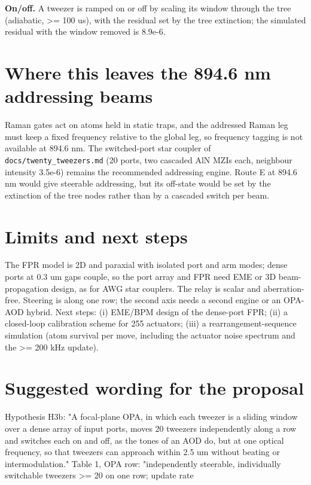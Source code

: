 \textbf{On/off.} A tweezer is ramped on or off by scaling its window
through the tree (adiabatic, \textgreater= 100 us), with the residual
set by the tree extinction; the simulated residual with the window
removed is 8.9e-6.

\hypertarget{5-where-this-leaves-the-8946-nm-addressing-beams}{%
\section{Where this leaves the 894.6 nm addressing
beams}\label{independent_steering-5-where-this-leaves-the-8946-nm-addressing-beams}}

Raman gates act on atoms held in static traps, and the addressed Raman
leg must keep a fixed frequency relative to the global leg, so frequency
tagging is not available at 894.6 nm. The switched-port star coupler of
\texttt{docs/twenty\_tweezers.md} (20 ports, two cascaded AlN MZIs each,
neighbour intensity 3.5e-6) remains the recommended addressing engine.
Route E at 894.6 nm would give steerable addressing, but its off-state
would be set by the extinction of the tree nodes rather than by a
cascaded switch per beam.

\hypertarget{6-limits-and-next-steps}{%
\section{Limits and next steps}\label{independent_steering-6-limits-and-next-steps}}

The FPR model is 2D and paraxial with isolated port and arm modes; dense
ports at 0.3 um gaps couple, so the port array and FPR need EME or 3D
beam-propagation design, as for AWG star couplers. The relay is scalar
and aberration-free. Steering is along one row; the second axis needs a
second engine or an OPA-AOD hybrid. Next steps: (i) EME/BPM design of
the dense-port FPR; (ii) a closed-loop calibration scheme for 255
actuators; (iii) a rearrangement-sequence simulation (atom survival per
move, including the actuator noise spectrum and the \textgreater= 200
kHz update).

\hypertarget{7-suggested-wording-for-the-proposal}{%
\section{Suggested wording for the
proposal}\label{independent_steering-7-suggested-wording-for-the-proposal}}

Hypothesis H3b: "A focal-plane OPA, in which each tweezer is a sliding
window over a dense array of input ports, moves 20 tweezers
independently along a row and switches each on and off, as the tones of
an AOD do, but at one optical frequency, so that tweezers can approach
within 2.5 um without beating or intermodulation." Table 1, OPA row:
"independently steerable, individually switchable tweezers \textgreater=
20 on one row; update rate

